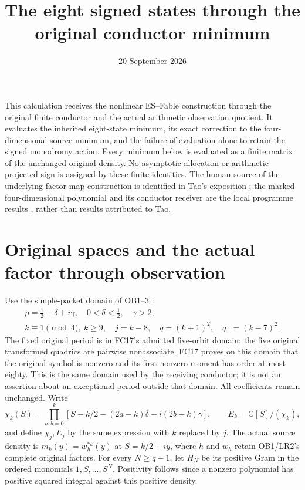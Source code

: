 \documentclass[11pt]{article}
\title{The eight signed states through the original conductor minimum}
\author{}
\date{20 September 2026}
\newcommand{\C}{\mathbb C}
\begin{document}
\maketitle

This calculation receives the nonlinear ES--Fable construction through
the original finite conductor and the actual arithmetic observation
quotient. It evaluates the inherited eight-state minimum, its exact
correction to the four-dimensional source minimum, and the failure of
evaluation alone to retain the signed monodromy action. Every minimum
below is evaluated as a finite matrix of the unchanged original density.
No asymptotic allocation or arithmetic projected sign is assigned by
these finite identities. The human source of the underlying factor-map
construction is identified in Tao's exposition \cite{Tao}; the marked
four-dimensional polynomial and its conductor receiver are the local
programme results \cite{FC}, rather than results attributed to Tao.

\section{Original spaces and the actual factor through observation}
Use the simple-packet domain of OB1--3 \cite{OB}:
\[
 \begin{gathered}
 \rho=\tfrac12+\delta+i\gamma,\quad0<\delta<\tfrac12,\quad\gamma>2,\\
 k\equiv1\pmod4,\ k\ge9,\quad j=k-8,\quad
 q=(k+1)^2,\quad q_-=(k-7)^2.
 \end{gathered}
\]
The fixed original period is in FC17's admitted five-orbit domain:
the five original transformed quadrics are pairwise nonassociate.
FC17 proves on this domain that the original symbol is nonzero and
its first nonzero moment has order at most eighty. This is the same
domain used by the receiving conductor; it is not an assertion about
an exceptional period outside that domain. All coefficients remain
unchanged. Write
\[
 \chi_k(S)=\prod_{a,b=0}^k
 [S-k/2-(2a-k)\delta-i(2b-k)\gamma],\qquad
 E_k=\C[S]/(\chi_k),
\]
and define $\chi_j,E_j$ by the same expression with $k$ replaced by $j$.
The actual source density is $m_k(y)=w_h^{*k}(y)$ at $S=k/2+iy$,
where $h$ and $w_h$ retain OB1/LR2's complete original factors.
For every $N\ge q-1$, let $H_N$ be its positive Gram in the ordered
monomials $1,S,\ldots,S^N$. Positivity follows since a nonzero
polynomial has positive squared integral against this positive density.
\end{document}

